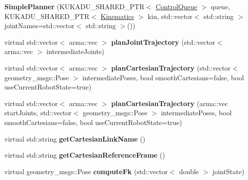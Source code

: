 \begin{DoxyCompactItemize}
\item 
{\bfseries Simple\+Planner} (K\+U\+K\+A\+D\+U\+\_\+\+S\+H\+A\+R\+E\+D\+\_\+\+P\+TR$<$ \hyperlink{classkukadu_1_1ControlQueue}{Control\+Queue} $>$ queue, K\+U\+K\+A\+D\+U\+\_\+\+S\+H\+A\+R\+E\+D\+\_\+\+P\+TR$<$ \hyperlink{classkukadu_1_1Kinematics}{Kinematics} $>$ kin, std\+::vector$<$ std\+::string $>$ joint\+Names=std\+::vector$<$ std\+::string $>$())\hypertarget{classkukadu_1_1SimplePlanner_af8de122b149675d5643b6331adff68fa}{}\label{classkukadu_1_1SimplePlanner_af8de122b149675d5643b6331adff68fa}

\item 
virtual std\+::vector$<$ arma\+::vec $>$ {\bfseries plan\+Joint\+Trajectory} (std\+::vector$<$ arma\+::vec $>$ intermediate\+Joints)\hypertarget{classkukadu_1_1SimplePlanner_ae47217c2e300e1b510f4c9fd7325fedc}{}\label{classkukadu_1_1SimplePlanner_ae47217c2e300e1b510f4c9fd7325fedc}

\item 
virtual std\+::vector$<$ arma\+::vec $>$ {\bfseries plan\+Cartesian\+Trajectory} (std\+::vector$<$ geometry\+\_\+msgs\+::\+Pose $>$ intermediate\+Poses, bool smooth\+Cartesians=false, bool use\+Current\+Robot\+State=true)\hypertarget{classkukadu_1_1SimplePlanner_aad7a23553297e05123565c99ac773d01}{}\label{classkukadu_1_1SimplePlanner_aad7a23553297e05123565c99ac773d01}

\item 
virtual std\+::vector$<$ arma\+::vec $>$ {\bfseries plan\+Cartesian\+Trajectory} (arma\+::vec start\+Joints, std\+::vector$<$ geometry\+\_\+msgs\+::\+Pose $>$ intermediate\+Poses, bool smooth\+Cartesians=false, bool use\+Current\+Robot\+State=true)\hypertarget{classkukadu_1_1SimplePlanner_aaef70f4952f29e543e1c2ade53c8381d}{}\label{classkukadu_1_1SimplePlanner_aaef70f4952f29e543e1c2ade53c8381d}

\item 
virtual std\+::string {\bfseries get\+Cartesian\+Link\+Name} ()\hypertarget{classkukadu_1_1SimplePlanner_aebcab78fe5627af2ad823220cdbce7f9}{}\label{classkukadu_1_1SimplePlanner_aebcab78fe5627af2ad823220cdbce7f9}

\item 
virtual std\+::string {\bfseries get\+Cartesian\+Reference\+Frame} ()\hypertarget{classkukadu_1_1SimplePlanner_ab1f21bd55c45d83fe64490d99e45c53b}{}\label{classkukadu_1_1SimplePlanner_ab1f21bd55c45d83fe64490d99e45c53b}

\item 
virtual geometry\+\_\+msgs\+::\+Pose {\bfseries compute\+Fk} (std\+::vector$<$ double $>$ joint\+State)\hypertarget{classkukadu_1_1SimplePlanner_ab21d2a091977216e8d01036f389c4dd7}{}\label{classkukadu_1_1SimplePlanner_ab21d2a091977216e8d01036f389c4dd7}


\end{DoxyCompactItemize}
